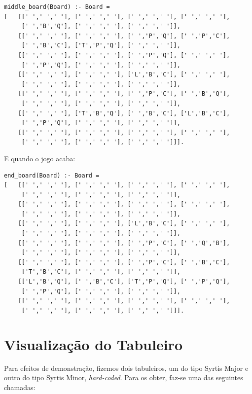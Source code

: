 \documentclass[a4paper]{article}
\begin{document}
\begin{lstlisting}
middle_board(Board) :- Board =
[	[[' ',' ',' '], [' ',' ',' '], [' ',' ',' '], [' ',' ',' '],
	 [' ','B','Q'], [' ',' ',' '], [' ',' ',' ']],
 	[[' ',' ',' '], [' ',' ',' '], [' ','P','Q'], [' ','P','C'],
 	 [' ','B','C'], ['T','P','Q'], [' ',' ',' ']],
	[[' ',' ',' '], [' ',' ',' '], [' ','P','Q'], [' ',' ',' '],
	 [' ','P','Q'], [' ',' ',' '], [' ',' ',' ']],
	[[' ',' ',' '], [' ',' ',' '], ['L','B','C'], [' ',' ',' '],
	 [' ',' ',' '], [' ',' ',' '], [' ',' ',' ']],
 	[[' ',' ',' '], [' ',' ',' '], [' ','P','C'], [' ','B','Q'],
 	 [' ',' ',' '], [' ',' ',' '], [' ',' ',' ']],
 	[[' ',' ',' '], ['T','B','Q'], [' ','B','C'], ['L','B','C'],
 	 [' ','P','Q'], [' ',' ',' '], [' ',' ',' ']],
 	[[' ',' ',' '], [' ',' ',' '], [' ',' ',' '], [' ',' ',' '],
 	 [' ',' ',' '], [' ',' ',' '], [' ',' ',' ']]].
\end{lstlisting}

E quando o jogo acaba:

\begin{lstlisting}
end_board(Board) :- Board =
[	[[' ',' ',' '], [' ',' ',' '], [' ',' ',' '], [' ',' ',' '],
	 [' ',' ',' '], [' ',' ',' '], [' ',' ',' ']],
 	[[' ',' ',' '], [' ',' ',' '], [' ',' ',' '], [' ',' ',' '],
 	 [' ',' ',' '], [' ',' ',' '], [' ',' ',' ']],
	[[' ',' ',' '], [' ',' ',' '], ['L','B','C'], [' ',' ',' '],
	 [' ',' ',' '], [' ',' ',' '], [' ',' ',' ']],
	[[' ',' ',' '], [' ',' ',' '], [' ','P','C'], [' ','Q','B'],
	 [' ',' ',' '], [' ',' ',' '], [' ',' ',' ']],
 	[[' ',' ',' '], [' ',' ',' '], [' ','P','C'], [' ','B','C'],
 	 ['T','B','C'], [' ',' ',' '], [' ',' ',' ']],
 	[['L','B','Q'], [' ','B','C'], ['T','P','Q'], [' ','P','Q'],
 	 [' ','P','Q'], [' ',' ',' '], [' ',' ',' ']],
 	[[' ',' ',' '], [' ',' ',' '], [' ',' ',' '], [' ',' ',' '],
 	 [' ',' ',' '], [' ',' ',' '], [' ',' ',' ']]].
\end{lstlisting}



\section{Visualização do Tabuleiro}

Para efeitos de demonstração, fizemos dois tabuleiros, um do tipo Syrtis Major e outro do tipo Syrtis Minor, \textit{hard-coded}. Para os obter, faz-se uma das seguintes chamadas:
\end{document}
